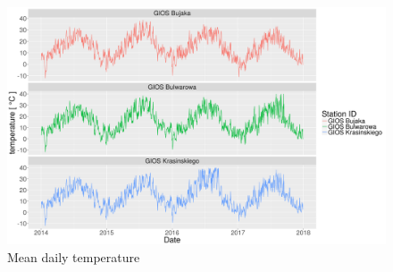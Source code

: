 \begin{landscape}
\begin{figure}[htp]
\centering
  \centering
      \includegraphics[width=\linewidth]{figures/dataset/trend/temperature_yearly_trend.png}
  \caption{Mean daily temperature}
  \label{fig:dataset-trend-temperature}
\end{figure}
\end{landscape}

